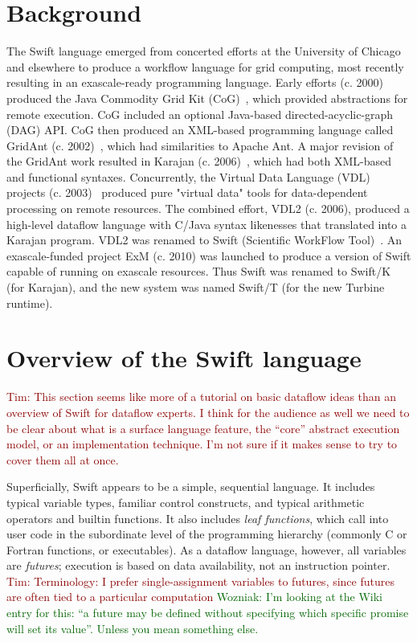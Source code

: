 \documentclass[conference,10pt]{IEEEtran}
\newcommand{\woz}[1]{ {\textcolor{darkgreen} { Wozniak: #1 }}}
\newcommand{\arm}[1]{ {\textcolor{darkred} { Tim: #1 }}}
\newcommand{\woz}[1]{}
\newcommand{\arm}[1]{}
\begin{document}
\section{Background}
\label{section:history}

The Swift language emerged from concerted efforts at the University of
Chicago and elsewhere to produce a workflow language for grid
computing, most recently resulting in an exascale-ready programming
language.  Early efforts (c. 2000) produced the Java Commodity Grid
Kit (CoG)~\cite{CoG_2001}, which provided abstractions for remote
execution.  CoG included an optional Java-based directed-acyclic-graph
(DAG) API.  CoG then produced an XML-based programming language called
GridAnt (c. 2002)~\cite{GridAnt_2002}, which had similarities to
Apache Ant.  A major revision of the GridAnt work resulted in Karajan
(c. 2006)~\cite{Karajan_Manual}, which had both XML-based and
functional syntaxes.  Concurrently, the Virtual Data Language (VDL)
projects (c. 2003)~\cite{VDG_2003} produced pure "virtual data" tools
for data-dependent processing on remote resources.  The combined
effort, VDL2 (c. 2006), produced a high-level dataflow language with
C/Java syntax likenesses that translated into a Karajan program.  VDL2
was renamed to Swift (Scientific WorkFlow Tool)~\cite{Swift_2007}.  An
exascale-funded project ExM (c. 2010) was launched to produce a
version of Swift capable of running on exascale resources.  Thus Swift
was renamed to Swift/K (for Karajan), and the new system was named
Swift/T (for the new Turbine runtime).

\section{Overview of the Swift language}
\label{section:language}

\arm{This section seems like more of a tutorial on basic dataflow
ideas than an overview of Swift for dataflow experts.  I think
for the audience as well we need to be clear about what is a
surface language feature, the ``core'' abstract execution model,
or an implementation technique.  I'm not sure if it makes sense to
try to cover them all at once.}

Superficially, Swift appears to be a simple, sequential language.  It
includes typical variable types, familiar control
constructs, and typical arithmetic operators and builtin functions.  It
also includes \emph{leaf functions}, which call into user code in the
subordinate level of the programming hierarchy (commonly C or Fortran
functions, or executables).  As a dataflow language, however, all
variables are \emph{futures}; execution is based on data
availability, not an instruction pointer.  
\arm{Terminology: I prefer single-assignment variables to futures,
  since futures are often tied to a particular computation}
\woz{I'm looking at the Wiki entry for this: ``a future may be defined
  without specifying which specific promise will set its
  value''. Unless you mean something else.}
\end{document}
